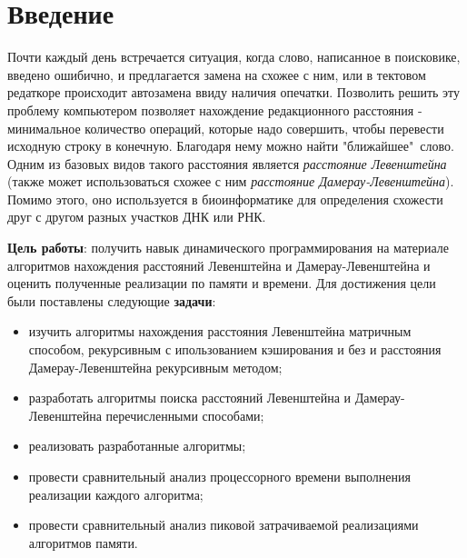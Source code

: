 \chapter*{Введение}
Почти каждый день встречается ситуация, когда слово, написанное в поисковике, введено ошибично, и предлагается замена на схожее с ним, или в тектовом редаткоре происходит автозамена ввиду наличия опечатки. Позволить решить эту проблему компьютером позволяет нахождение редакционного расстояния - минимальное количество операций, которые надо совершить, чтобы перевести исходную строку в конечную. \cite{edit_distance} Благодаря нему можно найти "ближайшее"\ слово. Одним из базовых видов такого расстояния является \textit{расстояние Левенштейна} (также может использоваться схожее с ним \textit{расстояние Дамерау-Левенштейна}). Помимо этого, оно используется в биоинформатике для определения схожести друг с другом разных участков ДНК или РНК. \cite{levenshtein} 

\textbf{Цель работы}: получить навык динамического программирования на материале алгоритмов нахождения расстояний Левенштейна и Дамерау-Левенштейна и оценить полученные реализации по памяти и времени. Для достижения цели были поставлены следующие \textbf{задачи}:
\begin{itemize}
	\item изучить алгоритмы нахождения расстояния Левенштейна матричным способом, рекурсивным с ипользованием кэширования и без и расстояния Дамерау-Левенштейна рекурсивным методом;
	\item разработать алгоритмы поиска расстояний Левенштейна и Дамерау-Левенштейна перечисленными способами;
	\item реализовать разработанные алгоритмы;
	\item провести сравнительный анализ процессорного времени выполнения реализации каждого алгоритма;
	\item провести сравнительный анализ пиковой затрачиваемой реализациями алгоритмов памяти.
\end{itemize}